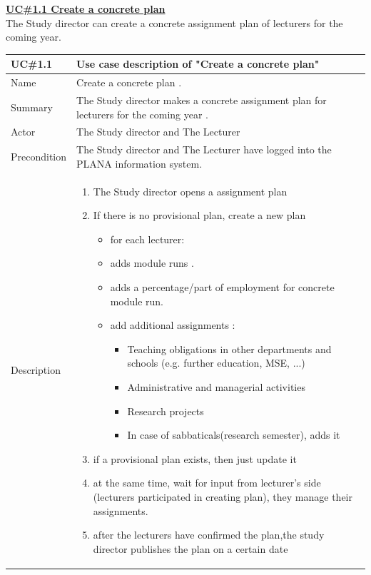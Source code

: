 \documentclass{scrartcl}
\begin{document}
\textbf{\underline{UC\#1.1 Create a concrete plan} }   \\
 The Study director can create a concrete assignment plan of lecturers for the coming year.    \\
  
 
\begin{table}[H]
\begin{center}
\begin{tabular}{| p{2.5cm}| p{12.5cm} |}
\hline
\textbf{UC\#1.1 } & \textbf{Use case description of "Create a concrete plan" } \\
\hline
Name  & Create  a concrete plan .\\ \hline
	         Summary  & The Study director makes a concrete assignment plan for  lecturers for the coming year . \\ \hline
	         Actor   & The Study director and The Lecturer\\ \hline
	         Precondition & The Study director and The Lecturer have logged into the PLANA information system. \\ \hline
	         Description & 
	         
	         \begin{enumerate}
	   		\item The Study director opens a assignment plan
			\item If there is no provisional plan, create a new plan 
				\begin{itemize}
				\item for each lecturer:
				\item  adds module runs . 
				\item adds a percentage/part of employment for concrete module run.
				\item add additional assignments :
				           \begin{itemize}
			 			 \item Teaching obligations in other departments and schools (e.g. further education, MSE, ...)
			 			 \item Administrative and managerial activities
			  			\item Research projects
			 			
			 			   \item In case of sabbaticals(research semester), adds it 
			 		 \end{itemize}
			
				
				\end{itemize}
				\item if a provisional plan exists, then just update it
			\item at the same time, wait for input from lecturer's side (lecturers participated in creating plan),  they manage their assignments.
			\item after the lecturers have confirmed the plan,the study director publishes the plan on a certain date
			                

\end{enumerate}
\end{tabular}
\end{center}
\end{table}
\end{document}
